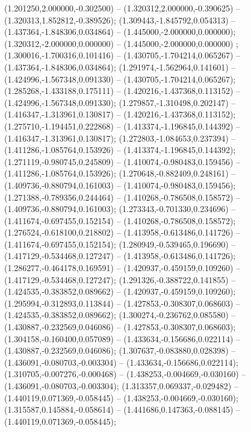  (1.201250,2.000000,-0.302500) -- (1.320312,2.000000,-0.390625) -- (1.320313,1.852812,-0.389526);
 (1.309443,-1.845792,0.054313) -- (1.437364,-1.848306,0.034864) -- (1.445000,-2.000000,0.000000);
 (1.320312,-2.000000,0.000000) -- (1.445000,-2.000000,0.000000) ;
 (1.300016,-1.700316,0.101416) -- (1.430705,-1.704214,0.065267) -- (1.437364,-1.848306,0.034864);
 (1.291974,-1.562964,0.141601) -- (1.424996,-1.567348,0.091330) -- (1.430705,-1.704214,0.065267);
 (1.285268,-1.433188,0.175111) -- (1.420216,-1.437368,0.113152) -- (1.424996,-1.567348,0.091330);
 (1.279857,-1.310498,0.202147) -- (1.416347,-1.313961,0.130817) -- (1.420216,-1.437368,0.113152);
 (1.275710,-1.194451,0.222868) -- (1.413374,-1.196845,0.144392) -- (1.416347,-1.313961,0.130817);
 (1.272803,-1.084653,0.237394) -- (1.411286,-1.085764,0.153926) -- (1.413374,-1.196845,0.144392);
 (1.271119,-0.980745,0.245809) -- (1.410074,-0.980483,0.159456) -- (1.411286,-1.085764,0.153926);
 (1.270648,-0.882409,0.248161) -- (1.409736,-0.880794,0.161003) -- (1.410074,-0.980483,0.159456);
 (1.271388,-0.789356,0.244464) -- (1.410268,-0.786508,0.158572) -- (1.409736,-0.880794,0.161003);
 (1.273343,-0.701330,0.234696) -- (1.411674,-0.697455,0.152154) -- (1.410268,-0.786508,0.158572);
 (1.276524,-0.618100,0.218802) -- (1.413958,-0.613486,0.141726) -- (1.411674,-0.697455,0.152154);
 (1.280949,-0.539465,0.196690) -- (1.417129,-0.534468,0.127247) -- (1.413958,-0.613486,0.141726);
 (1.286277,-0.464178,0.169591) -- (1.420937,-0.459159,0.109260) -- (1.417129,-0.534468,0.127247);
 (1.291326,-0.388722,0.141855) -- (1.424535,-0.383852,0.089662) -- (1.420937,-0.459159,0.109260);
 (1.295994,-0.312893,0.113844) -- (1.427853,-0.308307,0.068603) -- (1.424535,-0.383852,0.089662);
 (1.300274,-0.236762,0.085580) -- (1.430887,-0.232569,0.046086) -- (1.427853,-0.308307,0.068603);
 (1.304158,-0.160400,0.057089) -- (1.433634,-0.156686,0.022114) -- (1.430887,-0.232569,0.046086);
 (1.307637,-0.083880,0.028398) -- (1.436091,-0.080703,-0.003304) -- (1.433634,-0.156686,0.022114);
 (1.310705,-0.007276,-0.000468) -- (1.438253,-0.004669,-0.030160) -- (1.436091,-0.080703,-0.003304);
 (1.313357,0.069337,-0.029482) -- (1.440119,0.071369,-0.058445) -- (1.438253,-0.004669,-0.030160);
 (1.315587,0.145884,-0.058614) -- (1.441686,0.147363,-0.088145) -- (1.440119,0.071369,-0.058445);

